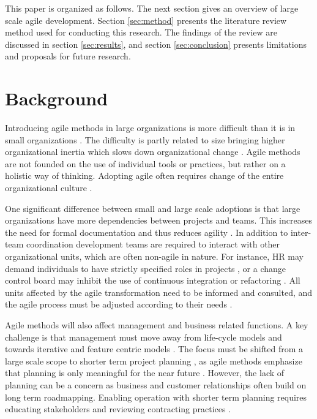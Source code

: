 \documentclass[lnbip]{svmultln}
\begin{document}
This paper is organized as follows. The next section gives an overview of large
scale agile development. Section \ref{sec:method} presents the literature review
method used for conducting this research. The findings of the review are
discussed in section \ref{sec:results}, and section \ref{sec:conclusion}
presents limitations and proposals for future research.


\section{Background}
\label{sec:background}

Introducing agile methods in large organizations is more difficult than it is in
small organizations . The difficulty is partly related to size
bringing higher organizational inertia which slows down organizational change
. Agile methods are not founded on the use of individual
tools or practices, but rather on a holistic way of thinking.
Adopting agile often requires change of the entire organizational culture
.

One significant difference between small and large scale adoptions is that large
organizations have more dependencies between projects and teams. This increases
the need for formal documentation and thus reduces agility .
In addition to inter-team coordination development teams are required to
interact with other organizational units, which are often non-agile in
nature. For instance, HR may demand individuals to have strictly specified roles
in projects , or a change control board may inhibit the use of
continuous integration or refactoring . All units affected
by the agile transformation need to be informed and consulted, and the agile
process must be adjusted according to their needs .

Agile methods will also affect management and business related functions. A key
challenge is that management must move away from life-cycle models and towards
iterative and feature centric models . The focus must be
shifted from a large scale scope to shorter term project planning
, as agile methods emphasize that planning is only meaningful
for the near future . However, the lack of planning can be a
concern as business and customer relationships often build on long term
roadmapping. Enabling operation with shorter term planning requires educating
stakeholders and reviewing contracting practices .
\end{document}
